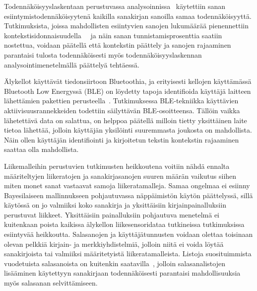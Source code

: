 \documentclass[finnish]{tktltiki2}
\theoremstyle{definition}
\theoremstyle{remark}
\begin{document}
Todennäköisyyslaskentaan perustuvassa analysoinnissa~\cite{mole} käytettiin sanan esiintymistodennäköisyytenä kaikilla sanakirjan sanoilla samaa todennäköisyyttä. Tutkimuksista, joissa mahdollisten esiintyvien sanojen lukumäärää pienennettiin kontekstisidonnaisuudella~\cite{liu}~\cite{mar} ja näin sanan tunnistamisprosenttia saatiin nostettua, voidaan päätellä että kontekstin päättely ja sanojen rajaaminen parantaisi tulosta todennäköisesti myös todennäköisyyslaskennan analysointimenetelmällä päättelyä tehtäessä. 

Älykellot käyttävät tiedonsiirtoon Bluetoothia, ja erityisesti kellojen käyttämässä Bluetooth Low Energyssä (BLE) on löydetty tapoja identifioida  käyttäjä laitteen lähettämien pakettien perusteella~\cite{das}. Tutkimuksessa BLE-tekniikka käyttävien aktiivisuusrannekkeiden todettiin säilyttävän BLE-osoitteensa. Tällöin vaikka lähetettävä data on salattua, on helppoa päätellä milloin tietty yksittäinen laite tietoa lähettää, jolloin käyttäjän yksilöinti suuremmasta joukosta on mahdollista. Näin ollen käyttäjän identifiointi ja kirjoitetun tekstin kontekstin rajaaminen saattaa olla mahdollista. 

Liikemalleihin perustuvien tutkimusten heikkoutena voitiin nähdä ennalta määriteltyjen liikeratojen ja sanakirjasanojen suuren määrän vaikutus siihen miten monet sanat vastaavat samoja liikeratamalleja. Samaa ongelmaa ei esiinny Bayesilaiseen mallinnukseen pohjautuvassa näppäimistön käytön päättelyssä, sillä käytössä on jo valmiiksi koko sanakirja ja yksittäisiin kirjainpainalluksiin perustuvat liikkeet. Yksittäisiin painalluksiin pohjautuva menetelmä ei kuitenkaan poista kaikissa älykellon liikesensoridataa tutkineissa tutkimuksissa esiintyvää heikkoutta. Salasanojen ja käyttäjätunnusten voidaan olettaa toisinaan olevan pelkkiä kirjain- ja merkkiyhdistelmiä, jolloin niitä ei voida löytää sanakirjoista tai valmiiksi määritetyistä liikeratamalleista. Listoja suosituimmista vuodetuista salasanoista on kuitenkin saatavilla~\cite{pw}, jolloin salasanalistojen lisääminen käytettyyn sanakirjaan todennäköisesti parantaisi mahdollisuuksia myös salasanan selvittämiseen. 
\end{document}
